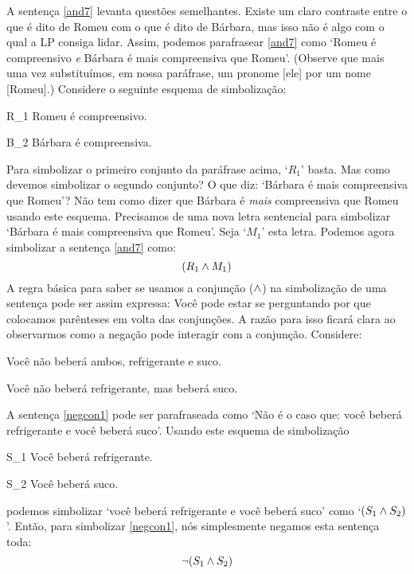 A sentença \ref{and7} levanta questões semelhantes.
Existe um claro contraste entre o que é dito de Romeu com o que é dito de Bárbara, mas isso não é algo com o qual a LP consiga lidar.
Assim, podemos parafrasear \ref{and7} como `Romeu é compreensivo \emph{e} Bárbara é mais compreensiva que Romeu'.
(Observe que mais uma vez substituímos, em nossa paráfrase, um pronome [ele] por um nome [Romeu].)
Considere o seguinte esquema de simbolização:
	\begin{ekey}
		\item[R_1] Romeu é compreensivo.
		\item[B_2] Bárbara é compreensiva.
	\end{ekey}
Para simbolizar o primeiro conjunto da paráfrase acima, `$R_1$' basta.
Mas como devemos simbolizar o segundo conjunto? O que diz: `Bárbara é mais compreensiva que Romeu'?
Não tem como dizer que Bárbara é \emph{mais} compreensiva que Romeu usando este esquema.
Precisamos de uma nova letra sentencial para simbolizar `Bárbara é mais compreensiva que Romeu'. Seja `$M_1$' esta letra.
Podemos agora simbolizar a sentença \ref{and7} como:
$$(R_1 \wedge M_1)$$
A regra básica para saber se usamos a conjunção ($\wedge$) na simbolização de uma sentença pode ser assim expressa:
Você pode estar se perguntando por que colocamos parênteses em volta das conjunções.
A razão para isso ficará clara ao observarmos como a negação pode interagir com a conjunção.
Considere:
	\begin{earg}
		\item[\ex{negcon1}] Você não beberá ambos, refrigerante e suco.
		\item[\ex{negcon2}] Você não beberá refrigerante, mas beberá suco.
	\end{earg}
A sentença \ref{negcon1} pode ser parafraseada como `Não é o caso que: você beberá refrigerante e você beberá suco'.
Usando este esquema de simbolização
	\begin{ekey}
		\item[S_1] Você beberá refrigerante.
		\item[S_2] Você beberá suco.
	\end{ekey}
podemos simbolizar `você beberá refrigerante e você beberá suco' como `$(S_1 \wedge S_2)$'.
Então, para simbolizar \ref{negcon1}, nós simplesmente negamos esta sentença toda:
$$\neg(S_1 \wedge S_2)$$
